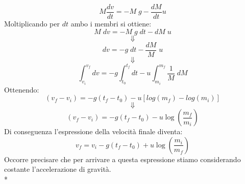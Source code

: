 \documentclass[10pt,a4paper]{book}
\begin{document}
$$
M\frac{dv}{dt} = -M\;g - \frac{dM}{dt}u
$$
Moltiplicando per $dt$ ambo i membri si ottiene:
$$
M\;dv = -M\;g\;dt - dM\;u
$$
$$
\Downarrow
$$
$$
dv = -g\;dt - \frac{dM}{M}\;u
$$
$$
\Downarrow
$$
$$
\int_{v_i}^{v_f}dv = -g\int_{t_0}^{t_f}dt - u\int_{m_i}^{m_f}\frac{1}{M}\;dM
$$\newpage
\noindent{}Ottenendo:
$$
(v_f - v_i) = -g(t_f - t_0) - u[log(m_f) - log(m_i)]
$$
$$\Downarrow$$
$$
(v_f - v_i) = -g(t_f - t_0) - u\log\left(\frac{m_f}{m_i}\right)
$$
Di conseguenza l'espressione della velocità finale diventa:
$$
v_f = v_i -g(t_f - t_0) + u \log\left(\frac{m_i}{m_f}\right)
$$
Occorre precisare che per arrivare a questa espressione stiamo considerando costante l'accelerazione di gravità.\\*
\end{document}

